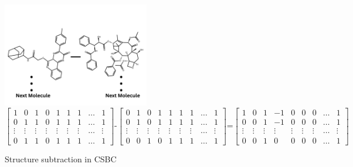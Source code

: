 \vspace{-0.55cm}
\begin{figure}[h] %
	\centering
	\includegraphics[width=0.57\textwidth]{mol15_minus_mol135.png} %
	\vspace{-0.5cm}
	\begin{equation*}
		\begin{bmatrix}
			1 & 0 & 1 & 0 & 1 & 1 & 1 & \ldots & 1 \\ 
			0 & 1 & 1 & 0 & 1 & 1 & 1 & \ldots & 1 \\
			\vdots & \vdots & \vdots & \vdots & \vdots & \vdots & \vdots & \ldots & \vdots \\
			0 & 1 & 1 & 0 & 1 & 1 & 1 & \ldots & 1
		\end{bmatrix}
		\text{-}
		\begin{bmatrix}
			0 & 1 & 0 & 1 & 1 & 1 & 1 & \ldots & 1 \\ 
			0 & 1 & 0 & 1 & 1 & 1 & 1 & \ldots & 1 \\
			\vdots & \vdots & \vdots & \vdots & \vdots & \vdots & \vdots & \ldots & \vdots \\
			0 & 0 & 1 & 0 & 1 & 1 & 1 & \ldots & 1
		\end{bmatrix}
		\text{=}
		\begin{bmatrix}
			1 & 0 & 1 & -1 & 0 & 0 & 0 & \ldots & 1 \\ 
			0 & 0 & 1 & -1& 0 & 0 & 0 & \ldots & 1 \\
			\vdots & \vdots & \vdots & \vdots & \vdots & \vdots & \vdots & \ldots & \vdots \\
			0 & 0 & 1 & 0 & 0 & 0 & 0 & \ldots & 1
		\end{bmatrix}
	\end{equation*}
	\caption{Structure subtraction in CSBC}
	\vspace{-0.3cm}
	\label{fig:subtraction} %
\end{figure}
      
